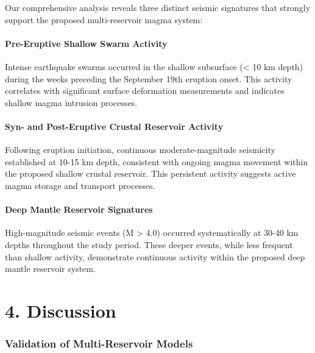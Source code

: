 \documentclass[
  letterpaper,
]{book}
\begin{document}
Our comprehensive analysis reveals three distinct seismic signatures
that strongly support the proposed multi-reservoir magma system:

\subsubsection{Pre-Eruptive Shallow Swarm
Activity}\label{pre-eruptive-shallow-swarm-activity}

Intense earthquake swarms occurred in the shallow subsurface
(\textless{} 10 km depth) during the weeks preceding the September 19th
eruption onset. This activity correlates with significant surface
deformation measurements and indicates shallow magma intrusion
processes.

\subsubsection{Syn- and Post-Eruptive Crustal Reservoir
Activity}\label{syn--and-post-eruptive-crustal-reservoir-activity}

Following eruption initiation, continuous moderate-magnitude seismicity
established at 10-15 km depth, consistent with ongoing magma movement
within the proposed shallow crustal reservoir. This persistent activity
suggests active magma storage and transport processes.

\subsubsection{Deep Mantle Reservoir
Signatures}\label{deep-mantle-reservoir-signatures}

High-magnitude seismic events (M \textgreater{} 4.0) occurred
systematically at 30-40 km depths throughout the study period. These
deeper events, while less frequent than shallow activity, demonstrate
continuous activity within the proposed deep mantle reservoir system.


\chapter{4. Discussion}\label{discussion}

\subsection{Validation of Multi-Reservoir
Models}\label{validation-of-multi-reservoir-models}
\end{document}
